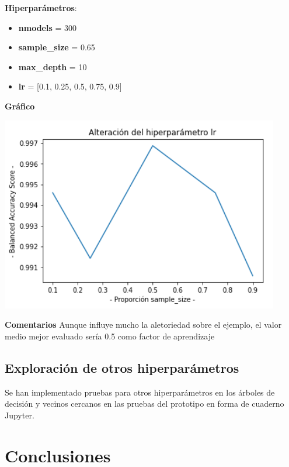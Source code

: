 \documentclass[conference,a4paper]{IEEEtran}
\begin{document}
\begin{textb}
    \textbf{Hiperparámetros}:
  \begin{itemize}
      \item \textbf{nmodels} = 300
      \item \textbf{sample\_size} = 0.65
      \item \textbf{max\_depth} = 10
      \item \textbf{lr} = [0.1, 0.25, 0.5, 0.75, 0.9]
  \end{itemize}
  \textbf{Gráfico}
  
  \begin{center}
    \includegraphics[scale=0.80]{figures/lr_BreastCancerDataset_trees.png}
    \label{fig:funcion_clasificacion}
  \end{center}
  
  \textbf{Comentarios} Aunque influye mucho la aletoriedad sobre el ejemplo, el valor medio mejor evaluado sería 0.5 como factor de aprendizaje
\end{textb}


\subsection{Exploración de otros hiperparámetros}

Se han implementado pruebas para otros hiperparámetros en los árboles de decisión y vecinos cercanos en las pruebas del prototipo en forma de cuaderno Jupyter.


\section{Conclusiones}
\end{document}
